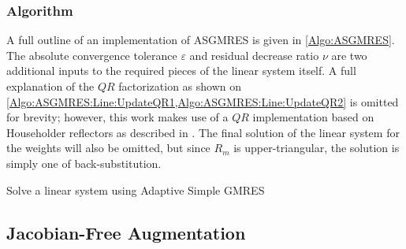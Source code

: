 \subsubsection{Algorithm}
A full outline of an implementation of ASGMRES is given in \cref{Algo:ASGMRES}.
The absolute convergence tolerance $\varepsilon$ and residual decrease ratio $\nu$ are two additional inputs to the required pieces of the linear system itself.
A full explanation of the $QR$ factorization as shown on \cref{Algo:ASGMRES:Line:UpdateQR1,Algo:ASGMRES:Line:UpdateQR2} is omitted for brevity; however, this work makes use of a $QR$ implementation based on Householder reflectors as described in \cite{datta_numerical_2010}.
The final solution of the linear system for the weights will also be omitted, but since $R_m$ is upper-triangular, the solution is simply one of back-substitution.

\begin{algorithm}[t]
    \caption{Solve a linear system using Adaptive Simple GMRES}
    \label{Algo:ASGMRES}
\end{algorithm}



\clearpage
\subsection{Jacobian-Free Augmentation}

